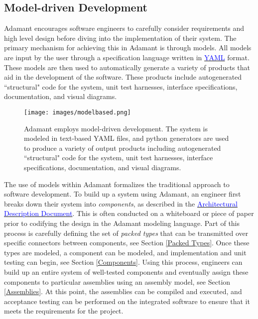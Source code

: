 \subsection{Model-driven Development}

Adamant encourages software engineers to carefully consider requirements and high level design before diving into the implementation of their system. The primary mechanism for achieving this in Adamant is through models. All models are input by the user through a specification language written in \href{http://yaml.org}{\textcolor{blue}{YAML}} format. These models are then used to automatically generate a variety of products that aid in the development of the software. These products include autogenerated ``structural" code for the system, unit test harnesses, interface specifications, documentation, and visual diagrams.

\begin{figure}[H]
  \texttt{[image: images/modelbased.png]}
  \caption{Adamant employs model-driven development. The system is modeled in text-based YAML files, and python generators are used to produce a variety of output products including autogenerated ``structural" code for the system, unit test harnesses, interface specifications, documentation, and visual diagrams.}
\end{figure}

The use of models within Adamant formalizes the traditional approach to software development. To build up a system using Adamant, an engineer first breaks down their system into \textit{components}, as described in the \href{https://github.com/lasp/adamant/blob/main/doc/architecture_description_document/architecture_description_document.pdf}{\textcolor{blue}{Architectural Description Document}}. This is often conducted on a whiteboard or piece of paper prior to codifying the design in the Adamant modeling language. Part of this process is carefully defining the set of \textit{packed types} that can be transmitted over specific connectors between components, see Section \ref{Packed Types}. Once these types are modeled, a component can be modeled, and implementation and unit testing can begin, see Section \ref{Components}. Using this process, engineers can build up an entire system of well-tested components and eventually assign these components to particular assemblies using an assembly model, see Section \ref{Assemblies}. At this point, the assemblies can be compiled and executed, and acceptance testing can be performed on the integrated software to ensure that it meets the requirements for the project.

